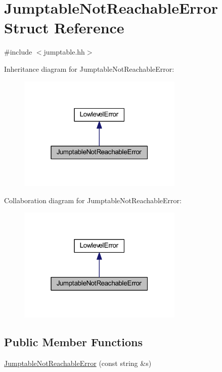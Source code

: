 \hypertarget{struct_jumptable_not_reachable_error}{}\section{Jumptable\+Not\+Reachable\+Error Struct Reference}
\label{struct_jumptable_not_reachable_error}


{\ttfamily \#include $<$jumptable.\+hh$>$}



Inheritance diagram for Jumptable\+Not\+Reachable\+Error\+:
\nopagebreak
\begin{figure}[H]
\begin{center}
\leavevmode
\includegraphics[width=223pt]{struct_jumptable_not_reachable_error__inherit__graph}
\end{center}
\end{figure}


Collaboration diagram for Jumptable\+Not\+Reachable\+Error\+:
\nopagebreak
\begin{figure}[H]
\begin{center}
\leavevmode
\includegraphics[width=223pt]{struct_jumptable_not_reachable_error__coll__graph}
\end{center}
\end{figure}
\subsection*{Public Member Functions}
\begin{DoxyCompactItemize}
\item 
\mbox{\hyperlink{struct_jumptable_not_reachable_error_a5755f35d07aa25ba9113f1ac524cb51c}{Jumptable\+Not\+Reachable\+Error}} (const string \&s)
\end{DoxyCompactItemize}
